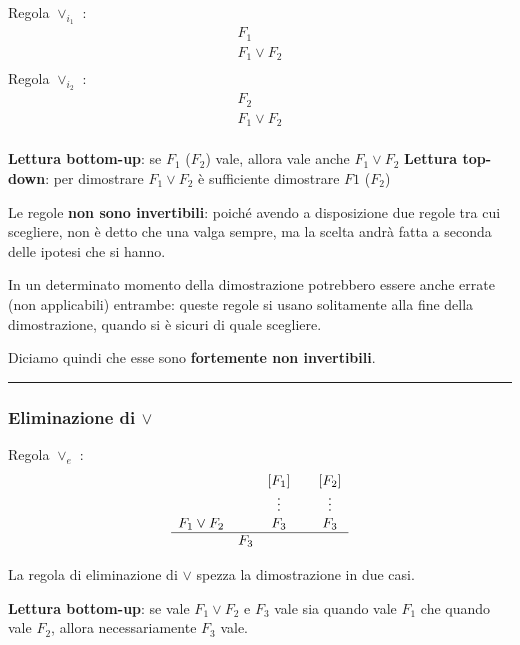 \documentclass[
  a4paper,
]{article}
\begin{document}
Regola \(\lor_{i_1}\) : \[
\begin{matrix} 
F_1 \\
\hline
F_1 \lor F_2 \\
\end{matrix}
\] Regola \(\lor_{i_2}\) : \[
\begin{matrix} 
F_2 \\
\hline
F_1 \lor F_2 \\
\end{matrix}
\]

\textbf{Lettura bottom-up}: se \(F_1\) (\(F_2\)) vale, allora vale anche
\(F_1 \lor F_2\) \textbf{Lettura top-down}: per dimostrare
\(F_1 \lor F_2\) è sufficiente dimostrare \(F1\) (\(F_2\))

Le regole \textbf{non sono invertibili}: poiché avendo a disposizione
due regole tra cui scegliere, non è detto che una valga sempre, ma la
scelta andrà fatta a seconda delle ipotesi che si hanno.

In un determinato momento della dimostrazione potrebbero essere anche
errate (non applicabili) entrambe: queste regole si usano solitamente
alla fine della dimostrazione, quando si è sicuri di quale scegliere.

Diciamo quindi che esse sono \textbf{fortemente non invertibili}.

\par\noindent\rule{\linewidth}{0.4pt}\par\vspace{6pt}

\hypertarget{eliminazione-di-lor}{%
\subsubsection{\texorpdfstring{Eliminazione di
\(\lor\)}{Eliminazione di \textbackslash lor}}\label{eliminazione-di-lor}}

Regola \(\lor_e\) : \[
\begin{matrix} 
&&[F_1] && [F_2] \\
&&\vdots && \vdots \\
F_1 \lor F_2 && F_3 && F_3 \\
\hline
& F_3 
\end{matrix}
\]

La regola di eliminazione di \(\lor\) spezza la dimostrazione in due
casi.

\textbf{Lettura bottom-up}: se vale \(F_1 \lor F_2\) e \(F_3\) vale sia
quando vale \(F_1\) che quando vale \(F_2\), allora necessariamente
\(F_3\) vale.
\end{document}
